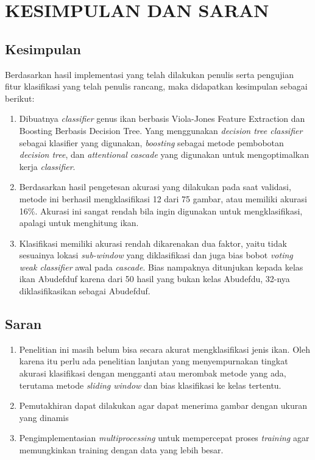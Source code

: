 
\chapter{KESIMPULAN DAN SARAN}

\section{Kesimpulan}
Berdasarkan hasil implementasi yang telah dilakukan penulis serta pengujian fitur klasifikasi yang 
telah penulis rancang, maka didapatkan kesimpulan sebagai berikut:

\begin{enumerate}
	\item Dibuatnya \textit{classifier} genus ikan berbasis Viola-Jones Feature Extraction dan Boosting
	Berbasis Decision Tree. Yang menggunakan \emph{decision tree classifier} 
	sebagai klasifier yang digunakan, \emph{boosting} sebagai metode pembobotan 
	\emph{decision tree}, dan 
	\emph{attentional cascade} yang digunakan untuk mengoptimalkan kerja \emph{classifier}.

	\item Berdasarkan hasil pengetesan akurasi yang dilakukan pada saat validasi, metode ini 
	berhasil mengklasifikasi 12 dari 75 gambar, atau memiliki akurasi 16\%. Akurasi ini 
	sangat rendah bila ingin digunakan untuk mengklasifikasi, apalagi untuk menghitung ikan.

	\item Klasifikasi memiliki akurasi rendah dikarenakan dua faktor, yaitu tidak 
	sesuainya lokasi \emph{sub-window} yang diklasifikasi dan juga bias bobot \textit{voting} 
	\emph{weak classifier} awal pada \emph{cascade}. Bias nampaknya ditunjukan kepada kelas 
	ikan Abudefduf karena dari 50 hasil yang bukan kelas Abudefdu, 32-nya diklasifikasikan 
	sebagai Abudefduf.

\end{enumerate}

\section{Saran}
\begin{enumerate}
	\item Penelitian ini masih belum bisa secara akurat mengklasifikasi jenis ikan. Oleh 
	karena itu perlu ada penelitian lanjutan yang menyempurnakan tingkat akurasi klasifikasi 
	dengan mengganti atau merombak metode yang ada, terutama metode \emph{sliding window} 
	dan bias klasifikasi ke kelas tertentu.
	\item Pemutakhiran dapat dilakukan agar dapat menerima gambar dengan ukuran yang 
	dinamis 
	\item Pengimplementasian \textit{multiprocessing} untuk mempercepat proses 
	\textit{training} agar memungkinkan training dengan data yang lebih besar.
\end{enumerate}

\begin{comment}

\end{comment}
